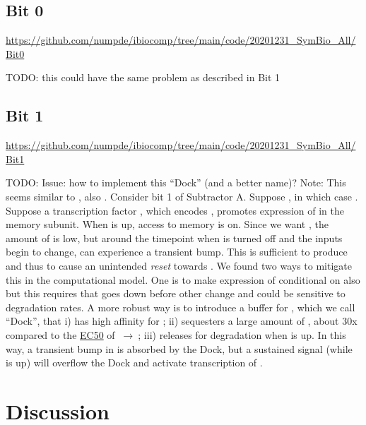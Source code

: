 \documentclass[12pt,notitlepage]{article}
\newcommand{\TODO}[1]{\textrm{\color{red}TODO: #1}}
\newcommand{\act}{\ {\ensuremath{\mathbin{\to}}}\ }
\newcommand{\ra}[1]{{\color{Blue}#1}}
\begin{document}
\subsection{Bit 0}

\url{https://github.com/numpde/ibiocomp/tree/main/code/20201231_SymBio_All/Bit0}

\TODO{this could have the same problem as described in Bit 1}

\subsection{Bit 1}

\url{https://github.com/numpde/ibiocomp/tree/main/code/20201231_SymBio_All/Bit1}


\TODO{\ra{Issue: how to implement this ``Dock'' (and a better name)?}}
\ra{%
Note: This seems similar to
\cite[\href{{https://www.pnas.org/content/pnas/104/8/2643/F1.large.jpg?width=800&height=600&carousel=1}}{Fig.~1}]{WeberETAL2007},
also
\cite{NilgiriwalaETAL2014}.
}
%
Consider bit 1 of Subtractor A.
%
Suppose ,
in which case .
%
Suppose a transcription factor ,
which encodes ,
promotes expression of  in the memory subunit.
%
%
When  is up,
access to memory is on.
%
Since we want ,
the amount of  is low,
but
around the timepoint when 
 is turned off
and the inputs begin to change,
 can experience a transient bump.
%
This is sufficient to produce 
and thus to cause an unintended \emph{reset}
towards .
%
We found two ways to mitigate this
in the computational model.
%
One is to make expression of 
conditional on  also
but this requires that  goes down
before other change
and could be sensitive to degradation rates.
%
A more robust way
is to introduce a buffer for ,
which we call ``Dock'',
that 
%
i)
has high affinity for ;
%
ii)
sequesters a large amount of ,
about 30x compared to the 
\href{https://en.wikipedia.org/wiki/EC50}{EC50}
of  \act {};
%
iii)
releases  for degradation when  is up.
%
In this way, 
a transient bump in  is absorbed 
by the Dock,
but a sustained signal 
(while  is up)
will overflow the Dock and activate 
transcription of .
%


%

\section{Discussion}
\end{document}
